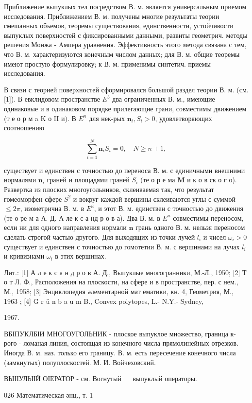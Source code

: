 \documentclass[10pt]{article}
\begin{document}
Приближение выпуклых тел посредством В. м. является универсальным приемом исследования. Приближением В. м. получены многие результаты теории смешанных объемов, теоремы существования, единственности, устойчивости выпуклых поверхностей с фиксированными данными, развиты геометрич. методы решения Монжа - Aмпера уравнения. Эффективность этого метода связана с тем, что В. м. характеризуются конечным числом данных; для В. м. общие теоремы имеют простую формулировку; к В. м. применимы синтетич. приемы исследования.



В связи с теорией поверхностей сформировался большой раздел теории В. м. (см. [1]). В евклидовом пространстве $E^{3}$ два ограниченных В. м., имеющие одинаковые и в одинаковом порядке прилегающие грани, совместимы движением (т е о р м a K о II и). В $E^{n}$ для нек-рых $\boldsymbol{n}_{i}, S_{i}>0$, удовлетворяющих соотношению



\[

\sum_{i=1}^{N} \boldsymbol{n}_{i} S_{i}=0, \quad N \geqslant n+1,

\]



существует и единствен с точностью до переноса В. м. с единичными внешними нормалями $\boldsymbol{n}_{i}$ граней и площадями граней $S_{i}$ (те о р е ма $\mathbf{M}$ и к о в ск о г о). Развертка из плоских многоугольников, склеиваемая так, что результат гомеоморфен сфере $S^{2}$ и вокруг каждой вершины склеиваются углы с суммой $\leqslant 2 \pi$, изометрична В. м. в $E^{3}$, и этот В. м. единствен с точностью до движения (те о ре м а А. Д. А ле к с а нд р о в а). Два В. м. в $E^{n}$ совместимы переносом, если ни для одного направления нормали $\boldsymbol{n}$ грань одного В. м. нельзя переносом сделать строгой частью другого. Для выходящих из точки лучей $l_{i}$ и чисел $\omega_{i}>0$ существует и единствен с точностью до гомотетии В. м. с вершинами на лучах $l_{i}$ и кривизнами $\omega_{i}$ в этих вершинах.



Лит.: [1] А л е к с а н д р о в А. Д., Выпуклые многогранники, М.-Л., 1950; [2] Т о т Л. Ф., Расположения на плоскости, на сфере и в пространстве, пер. с нем., М., 1958; [3] Энциклопедия әлементарной мат ематики, кн. 4, Геометрия, М., 1963 ; [4] G r ü n b a u m B., Convex polytopes, L.- N.Y.- Sydney,

1967.



ВБІПУКЛБІИ МНОГОУГОЛЬНИК - плоское выпуклое множество, граница к-рого - ломаная линия, состоящая из конечного числа прямолинейных отрезков. Иногда В. м. наз. только его границу. В. м. есть пересечение конечного числа (замкнутых) полуплоскостей. М. И. Войчеховский.



ВЫІІУЛЫІЙ ОІЕРАТОР - см. Вогнутый $\quad$ выпуклый операторы.



026 Математическая әнц., т. 1
\end{document}
